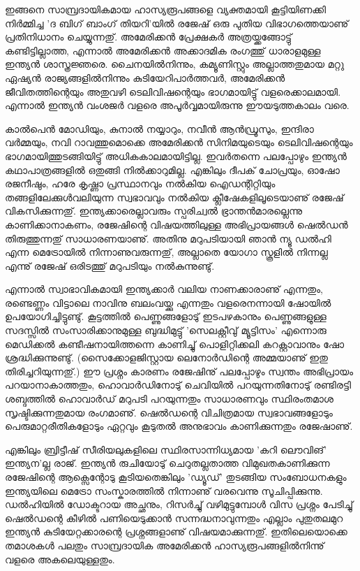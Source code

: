ഇങ്ങനെ സാമ്പ്രദായികമായ ഹാസ്യരൂപങ്ങളെ വ്യക്തമായി കൂട്ടിയിണക്കി നിര്‍മ്മിച്ച 'ദ ബിഗ് ബാംഗ് തിയറി'യില്‍ രജേഷ് ഒരു 
പുതിയ വിഭാഗത്തെയാണു് പ്രതിനിധാനം ചെയ്യുന്നതു്. അമേരിക്കന്‍ പ്രേക്ഷകര്‍ അത്രയ്ക്കങ്ങോട്ടു് കണ്ടിട്ടില്ലാത്ത, എന്നാല്‍ അമേരിക്കന്‍ 
അക്കാദമിക രംഗത്തു് ധാരാളമുള്ള ഇന്ത്യന്‍ ശാസ്ത്രജ്ഞരെ. ചൈനയില്‍നിന്നും, കമ്യൂണിസ്റ്റും അല്ലാത്തതുമായ മറ്റു ഏഷ്യന്‍ 
രാജ്യങ്ങളില്‍നിന്നും കുടിയേറിപാര്‍ത്തവര്‍, അമേരിക്കന്‍ ജീവിതത്തിന്റെയും അതുവഴി ടെലിവിഷന്റെയും ഭാഗമായിട്ടു് വളരെക്കാലമായി. 
എന്നാല്‍ ഇന്ത്യന്‍ വംശജര്‍ വളരെ അപൂര്‍വ്വമായിരുന്നു ഈയടുത്തകാലം വരെ.

കാല്‍പെന്‍ മോഡിയും, കുനാല്‍ നയ്യാറും, നവീന്‍ ആന്‍ഡ്രൂസും, ഇന്ദിരാ വര്‍മ്മയും, നവി റാവത്തുമൊക്കെ അമേരിക്കന്‍ 
സിനിമയുടെയും ടെലിവിഷന്റെയും ഭാഗമായിത്തുടങ്ങിയിട്ടു് അധികകാലമായിട്ടില്ല. ഇവര്‍തന്നെ പലപ്പോഴും ഇന്ത്യന്‍ കഥാപാത്രങ്ങളില്‍ 
ഒതുങ്ങി നില്‍ക്കാറുമില്ല. എങ്കിലും ദീപക് ചോപ്രയും, ഓഷോ രജനീഷും, ഹരേ കൃഷ്ണാ പ്രസ്ഥാനവും നല്‍കിയ ഐഡന്റിറ്റിയും 
തങ്ങളിലേക്കുള്‍വലിയുന്ന സ്വഭാവവും നല്‍കിയ ക്ലീഷേകളിലൂടെയാണു് രജേഷ് വികസിക്കുന്നതു്. ഇന്ത്യക്കാരെല്ലാവരും സ്പരിച്വല്‍ 
ഭ്രാന്തന്‍മാരല്ലെന്നു കാണിക്കാനാകണം, രജേഷിന്റെ വിഷയത്തിലുള്ള അഭിപ്രായങ്ങള്‍ ഷെല്‍ഡന്‍ തിരുത്തുന്നതു് സാധാരണയാണു്.
 അതിനു മറുപടിയായി ഞാന്‍ ന്യൂ ഡല്‍ഹി എന്ന മെട്രോയില്‍ നിന്നാണുവരുന്നതു്, അല്ലാതെ യോഗാ സ്കൂളില്‍ നിന്നല്ല എന്നു് 
 രജേഷ് ഒരിടത്തു് മറുപടിയും നല്‍കുന്നുണ്ടു്.

എന്നാല്‍ സ്വാഭാവികമായി ഇന്ത്യക്കാര്‍ വലിയ നാണക്കാരാണു് എന്നതും, രണ്ടെണ്ണം വിട്ടാലെ നാവിനു ബലംവയ്ക്കു എന്നതും 
വളരെനന്നായി ഷോയില്‍ ഉപയോഗിച്ചിട്ടുണ്ടു്. കൂട്ടത്തില്‍ പെണ്ണുങ്ങളോടു് ഇടപഴകാനും പെണ്ണുങ്ങളുള്ള സദസ്സില്‍ 
സംസാരിക്കാനുമുള്ള ബുദ്ധിമുട്ടു് 'സെലക്റ്റീവു് മ്യൂട്ടിസം' എന്നൊരു മെഡിക്കല്‍ കണ്ടീഷനായിത്തന്നെ കാണിച്ചു് പൊളിറ്റിക്കലി
 കറക്റ്റാവാനും ഷോ ശ്രദ്ധിക്കുന്നുണ്ടു്. (സൈക്കോളജിസ്റ്റായ ലെനോര്‍ഡിന്റെ അമ്മയാണു് ഇതു തിരിച്ചറിയുന്നതു്.) ഈ പ്രശ്നം കാരണം
  രജേഷിനു് പലപ്പോഴും സ്വന്തം അഭിപ്രായം പറയാനാകാത്തതും, ഹൊവാര്‍ഡിനോടു് ചെവിയില്‍ പറയുന്നതിനോടു് രണ്ടിരട്ടി 
  ശബ്ദത്തില്‍ ഹൊവാര്‍ഡ് മറുപടി പറയുന്നതും സാധാരണവും സ്ഥിരംതമാശ സൃഷ്ടിക്കുന്നതുമായ രംഗമാണു്. ഷെല്‍ഡന്റെ 
  വിചിത്രമായ സ്വഭാവങ്ങളോടും പെരുമാറ്റരീതികളോടും ഏറ്റവും കൂടുതല്‍ അനുഭാവം കാണിക്കുന്നതും രജേഷാണു്.

എങ്കിലും ബ്രിട്ടീഷ് സീരിയലുകളിലെ സ്ഥിരസാന്നിധ്യമായ 'കറി ലൌവിങ്' ഇന്ത്യന'ല്ല രാജ്. ഇന്ത്യന്‍ രുചിയോടു് ചെറുതല്ലതാത്ത
 വിമുഖതകാണിക്കുന്ന രജേഷിന്റെ ആക്സെന്റോടു കൂടിയതെങ്കിലും 'ഡ്യൂഡ്' തുടങ്ങിയ സംബോധനകളും ഇന്ത്യയിലെ മെട്രോ
  സംസ്കാരത്തില്‍ നിന്നാണു് വരവെന്നു സൂചിപ്പിക്കുന്നു.
ഡല്‍ഹിയില്‍ ഡോക്ടറായ അച്ഛനും, റിസര്‍ച്ചു് വഴിമുട്ടുമ്പോള്‍ വിസ പ്രശ്നം പേടിച്ചു് ഷെല്‍ഡന്റെ കീഴില്‍ പണിയെടുക്കാന്‍ 
സന്നദ്ധനാവുന്നതും എല്ലാം പുതുതലമുറ ഇന്ത്യന്‍ കുടിയേറ്റക്കാരന്റെ പ്രശ്നങ്ങളാണു് വിഷയമാക്കുന്നതു്. ഇതിലെയൊക്കെ തമാശകള്‍ 
പലതും സാമ്പ്രദായിക അമേരിക്കന്‍ ഹാസ്യരൂപങ്ങളില്‍നിന്നു് വളരെ അകലെയുള്ളതും.

